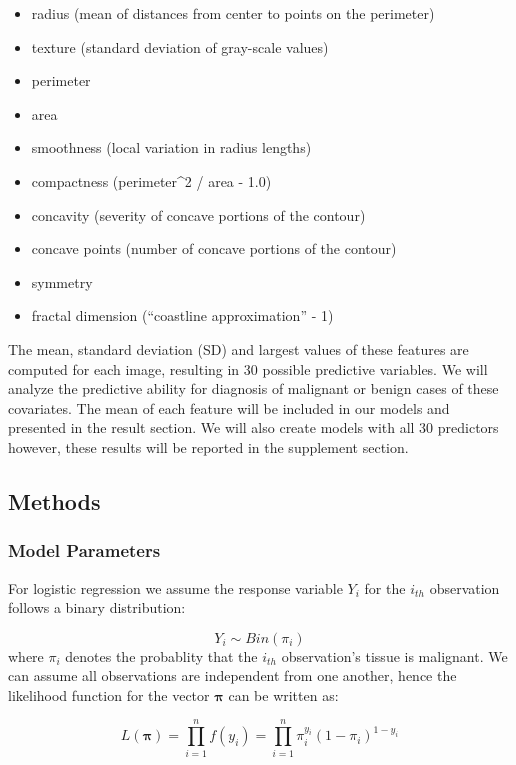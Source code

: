 \documentclass[]{article}
\providecommand{\tightlist}{%
  \setlength{\itemsep}{0pt}\setlength{\parskip}{0pt}}
\begin{document}
\begin{itemize}
\tightlist
\item
  radius (mean of distances from center to points on the perimeter)
\item
  texture (standard deviation of gray-scale values)
\item
  perimeter
\item
  area
\item
  smoothness (local variation in radius lengths)
\item
  compactness (perimeter\^{}2 / area - 1.0)
\item
  concavity (severity of concave portions of the contour)
\item
  concave points (number of concave portions of the contour)
\item
  symmetry
\item
  fractal dimension (``coastline approximation'' - 1)
\end{itemize}

The mean, standard deviation (SD) and largest values of these features
are computed for each image, resulting in 30 possible predictive
variables. We will analyze the predictive ability for diagnosis of
malignant or benign cases of these covariates. The mean of each feature
will be included in our models and presented in the result section. We
will also create models with all 30 predictors however, these results
will be reported in the supplement section.

\hypertarget{methods}{%
\subsection{Methods}\label{methods}}

\hypertarget{model-parameters}{%
\subsubsection{Model Parameters}\label{model-parameters}}

For logistic regression we assume the response variable \(Y_i\) for the
\(i_{th}\) observation follows a binary distribution:

\[Y_i\sim Bin(\pi_i)\] where \(\pi_i\) denotes the probablity that the
\(i_{th}\) observation's tissue is malignant. We can assume all
observations are independent from one another, hence the likelihood
function for the vector \(\boldsymbol\pi\) can be written as:

\[L(\boldsymbol\pi)=\prod_{i=1}^n f(y_i)=\prod_{i=1}^n\pi_i^{y_i}(1 - \pi_i)^{1-y_i}\]
\end{document}
